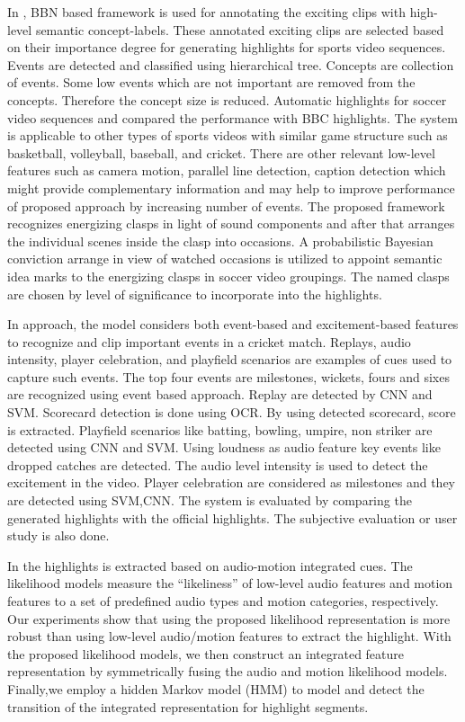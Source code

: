 In \cite{7101847}, BBN based framework is used for annotating the exciting clips with high-level semantic concept-labels. These annotated exciting clips are selected based on their importance degree for generating highlights for sports video sequences. Events are detected and classified using hierarchical tree. Concepts are collection of events. Some low events which are not important are removed from the concepts. Therefore the concept size is reduced. Automatic highlights for soccer video sequences and compared the performance with BBC highlights. The system is applicable to other types of sports videos with similar game structure such as basketball, volleyball, baseball, and cricket. There are other relevant low-level features such as camera motion, parallel line detection, caption detection which might provide complementary information and may help to improve performance of proposed approach by increasing number of events. The proposed framework  recognizes energizing clasps in light of sound components and after that arranges the individual scenes inside the clasp into occasions. A probabilistic Bayesian conviction arrange in view of watched occasions is utilized to appoint semantic idea marks to the energizing clasps in soccer video groupings. The named clasps are chosen by level of significance to incorporate into the highlights.

In \cite{8575397} approach, the model considers both event-based and excitement-based features to recognize and clip important events in a cricket match. Replays, audio intensity, player celebration, and playﬁeld scenarios are examples of cues used to capture such events. The top four events are milestones, wickets, fours and sixes are recognized using event based approach. Replay are detected by CNN and SVM. Scorecard detection is done using OCR. By using detected scorecard, score is extracted. Playfield scenarios like batting, bowling, umpire, non striker are detected using CNN and SVM. Using loudness as audio feature key events like dropped catches are detected. The audio level intensity is used to detect the excitement in the video. Player celebration are considered as milestones and they are detected using SVM,CNN. The system is evaluated by comparing the generated highlights with the official highlights. The subjective evaluation or user study is also done.

In \cite{1632043} the highlights is extracted  based on audio-motion integrated cues. The likelihood models measure the “likeliness” of low-level audio features and motion features to a set of predeﬁned audio types and motion categories, respectively. Our experiments show that using the proposed likelihood representation is more robust than using low-level audio/motion features to extract the highlight. With the proposed likelihood models, we then construct an integrated feature representation by symmetrically fusing the audio and motion likelihood models. Finally,we employ a hidden Markov model (HMM) to model and detect the transition of the integrated representation for highlight segments.

